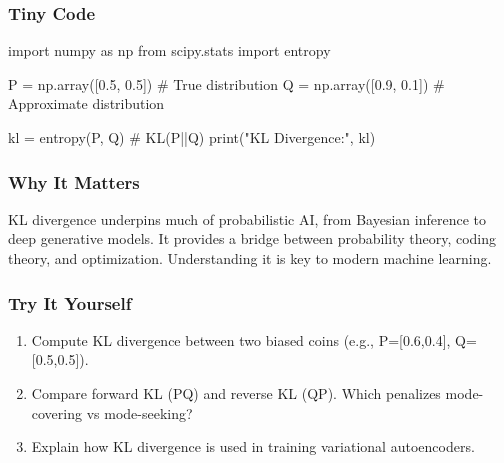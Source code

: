 \documentclass[
  letterpaper,
  DIV=11,
  numbers=noendperiod]{scrreprt}
\newenvironment{Shaded}{\begin{snugshade}}{\end{snugshade}}
\newcommand{\BuiltInTok}[1]{\textcolor[rgb]{0.00,0.23,0.31}{#1}}
\newcommand{\CommentTok}[1]{\textcolor[rgb]{0.37,0.37,0.37}{#1}}
\newcommand{\FloatTok}[1]{\textcolor[rgb]{0.68,0.00,0.00}{#1}}
\newcommand{\ImportTok}[1]{\textcolor[rgb]{0.00,0.46,0.62}{#1}}
\newcommand{\NormalTok}[1]{\textcolor[rgb]{0.00,0.23,0.31}{#1}}
\newcommand{\OperatorTok}[1]{\textcolor[rgb]{0.37,0.37,0.37}{#1}}
\newcommand{\StringTok}[1]{\textcolor[rgb]{0.13,0.47,0.30}{#1}}
\providecommand{\tightlist}{%
  \setlength{\itemsep}{0pt}\setlength{\parskip}{0pt}}
\begin{document}
\subsubsection{Tiny Code}\label{tiny-code-163}

\begin{Shaded}
\begin{Highlighting}[]
\ImportTok{import}\NormalTok{ numpy }\ImportTok{as}\NormalTok{ np}
\ImportTok{from}\NormalTok{ scipy.stats }\ImportTok{import}\NormalTok{ entropy}

\NormalTok{P }\OperatorTok{=}\NormalTok{ np.array([}\FloatTok{0.5}\NormalTok{, }\FloatTok{0.5}\NormalTok{])       }\CommentTok{\# True distribution}
\NormalTok{Q }\OperatorTok{=}\NormalTok{ np.array([}\FloatTok{0.9}\NormalTok{, }\FloatTok{0.1}\NormalTok{])       }\CommentTok{\# Approximate distribution}

\NormalTok{kl }\OperatorTok{=}\NormalTok{ entropy(P, Q)  }\CommentTok{\# KL(P||Q)}
\BuiltInTok{print}\NormalTok{(}\StringTok{"KL Divergence:"}\NormalTok{, kl)}
\end{Highlighting}
\end{Shaded}

\subsubsection{Why It Matters}\label{why-it-matters-61}

KL divergence underpins much of probabilistic AI, from Bayesian
inference to deep generative models. It provides a bridge between
probability theory, coding theory, and optimization. Understanding it is
key to modern machine learning.

\subsubsection{Try It Yourself}\label{try-it-yourself-163}

\begin{enumerate}
\def\labelenumi{\arabic{enumi}.}
\tightlist
\item
  Compute KL divergence between two biased coins (e.g., P={[}0.6,0.4{]},
  Q={[}0.5,0.5{]}).
\item
  Compare forward KL (P\textbar\textbar Q) and reverse KL
  (Q\textbar\textbar P). Which penalizes mode-covering vs mode-seeking?
\item
  Explain how KL divergence is used in training variational
  autoencoders.
\end{enumerate}
\end{document}
